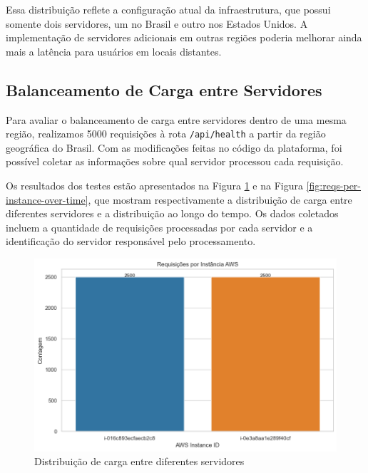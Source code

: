 Essa distribuição reflete a configuração atual da infraestrutura, que possui somente dois servidores, um no Brasil e outro nos Estados Unidos. A implementação de servidores adicionais em outras regiões poderia melhorar ainda mais a latência para usuários em locais distantes.

\subsection{Balanceamento de Carga entre Servidores}

Para avaliar o balanceamento de carga entre servidores dentro de uma mesma região, realizamos 5000 requisições à rota \texttt{/api/health} a partir da região geográfica do Brasil. Com as modificações feitas no código da plataforma, foi possível coletar as informações sobre qual servidor processou cada requisição.

Os resultados dos testes estão apresentados na Figura \ref{fig:reqs-per-instance} e na Figura \ref{fig:reqs-per-instance-over-time}, que mostram respectivamente a distribuição de carga entre diferentes servidores e a distribuição ao longo do tempo. Os dados coletados incluem a quantidade de requisições processadas por cada servidor e a identificação do servidor responsável pelo processamento.

\begin{figure}[H]
    \centering
    \includegraphics[width=1\textwidth]{assets/balance-test/reqs-per-instance.png}
    \caption{Distribuição de carga entre diferentes servidores}
    \label{fig:reqs-per-instance}
\end{figure}

